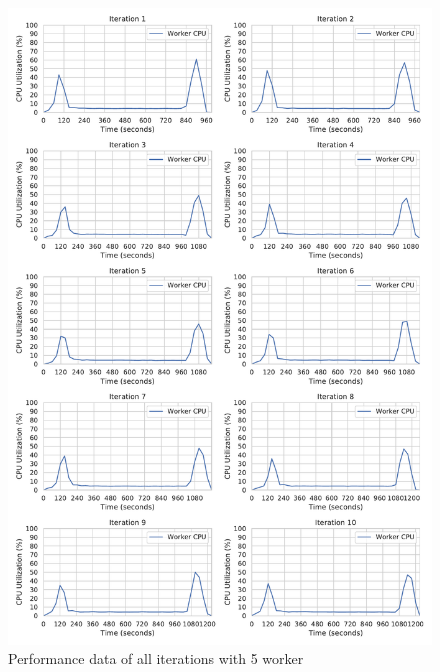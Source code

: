 \begin{figure}[h]
\centering
\includegraphics[scale=0.4]{images/07_evaluation/classification/5_worker_cpu_performance}
\caption{Performance data of all iterations with 5 worker}
\label{fig:appendix_eval_classification_static5}
\end{figure}

